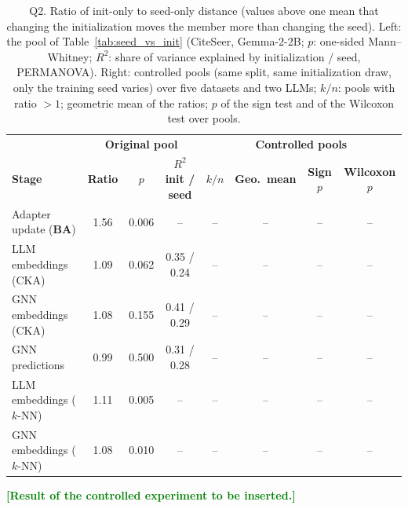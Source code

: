 \documentclass[a4paper,fleqn]{cas-sc}
\newcommand{\revthree}[1]{\textcolor{green}{#1}} %
\begin{document}
\begin{table}[t]
\centering\color{green}
\caption{Q2. Ratio of init-only to seed-only distance (values above one mean that changing the initialization moves the member more than changing the seed). Left: the pool of Table~\ref{tab:seed_vs_init} (CiteSeer, Gemma-2-2B; $p$: one-sided Mann--Whitney; $R^2$: share of variance explained by initialization / seed, PERMANOVA). Right: controlled pools (same split, same initialization draw, only the training seed varies) over five datasets and two LLMs; $k/n$: pools with ratio $>1$; geometric mean of the ratios; $p$ of the sign test and of the Wilcoxon test over pools.}
\label{tab:q2}
\small
\setlength{\tabcolsep}{3pt}
\begin{tabular*}{\textwidth}{@{\extracolsep{\fill}} lccc|cccc @{}}
\toprule
 & \multicolumn{3}{c|}{\textbf{Original pool}} & \multicolumn{4}{c}{\textbf{Controlled pools}} \\
\textbf{Stage} & \textbf{Ratio} & \textbf{$p$} & \textbf{$R^2$ init / seed} & \textbf{$k/n$} & \textbf{Geo.\ mean} & \textbf{Sign $p$} & \textbf{Wilcoxon $p$} \\
\midrule
Adapter update ($\mathbf{B}\mathbf{A}$) & 1.56 & 0.006 & -- & -- & -- & -- & -- \\
LLM embeddings (CKA)   & 1.09 & 0.062 & 0.35 / 0.24 & -- & -- & -- & -- \\
GNN embeddings (CKA)   & 1.08 & 0.155 & 0.41 / 0.29 & -- & -- & -- & -- \\
GNN predictions        & 0.99 & 0.500 & 0.31 / 0.28 & -- & -- & -- & -- \\
\midrule
LLM embeddings ($k$-NN) & 1.11 & 0.005 & -- & -- & -- & -- & -- \\
GNN embeddings ($k$-NN) & 1.08 & 0.010 & -- & -- & -- & -- & -- \\
\bottomrule
\end{tabular*}
\end{table}

\revthree{\textbf{[Result of the controlled experiment to be inserted.]}}
\end{document}
